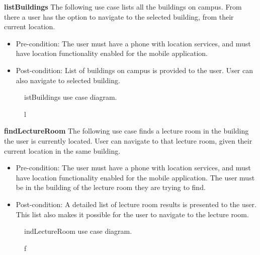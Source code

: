 \documentclass[12pt,a4paper]{article}
\begin{document}
			\textbf{listBuildings}
			The following use case lists all the buildings on campus. From there a user has the option to navigate to the 					selected building, from their current location.
			
			\begin{itemize}
			\item Pre-condition: The user must have a phone with location services, and must have location functionality 						  enabled for the mobile application.
			\item Post-condition: List of buildings on campus is provided to the user. User can also navigate to selected   					  building.
			\end{itemize}
			
			\begin{figure}[h!]
				\caption listBuildings use case diagram.
			\end{figure}
			
			\textbf{findLectureRoom}
			The following use case finds a lecture room in the building the user is currently located. User can navigate to 				that lecture room, given their current location in the same building.
			
			\begin{itemize}
			\item Pre-condition: The user must have a phone with location services, and must have location functionality 						  enabled for the mobile application. The user must be in the building of the lecture room they are trying 						  to find.
			\item Post-condition: A detailed list of lecture room results is presented to the user. This list also makes it 					  possible for the user to navigate to the lecture room.
			\end{itemize}
			
			\begin{figure}[h!]
				\caption findLectureRoom use case diagram.
			\end{figure}
			
\end{document}
